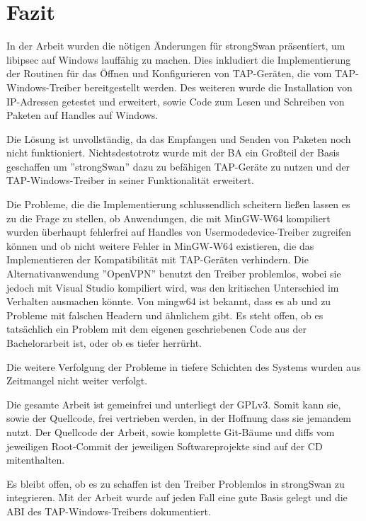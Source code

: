 



\section{Fazit}

In der Arbeit wurden die nötigen Änderungen für strongSwan präsentiert, um
libipsec auf Windows lauffähig zu machen. Dies inkludiert die Implementierung
der Routinen für das Öffnen und Konfigurieren von TAP-Geräten, die vom TAP-Windows-Treiber
bereitgestellt werden. Des weiteren wurde die Installation von IP-Adressen getestet
und erweitert, sowie Code zum Lesen und Schreiben von Paketen auf Handles auf Windows.

Die Lösung ist unvollständig, da das Empfangen und Senden von Paketen noch nicht funktioniert.
Nichtsdestotrotz wurde mit der \ac{BA} ein Großteil der Basis geschaffen um ''strongSwan''
dazu zu befähigen TAP-Geräte zu nutzen und der TAP-Windows-Treiber in seiner Funktionalität
erweitert.

Die Probleme, die die Implementierung schlussendlich scheitern ließen lassen es zu
die Frage zu stellen, ob Anwendungen, die mit MinGW-W64 kompiliert wurden überhaupt
fehlerfrei auf Handles von Usermodedevice-Treiber zugreifen können und ob
nicht weitere Fehler in MinGW-W64 existieren, die das Implementieren der Kompatibilität
mit TAP-Geräten verhindern. Die Alternativanwendung ''OpenVPN'' benutzt den
Treiber problemlos, wobei sie jedoch mit Visual Studio kompiliert wird,
was den kritischen Unterschied im Verhalten ausmachen könnte.
Von mingw64 ist bekannt, dass es ab und zu Probleme mit falschen Headern und ähnlichem
gibt. Es steht offen, ob es tatsächlich ein Problem mit dem eigenen geschriebenen Code
aus der Bachelorarbeit ist, oder ob es tiefer herrürht.

Die weitere Verfolgung der Probleme in tiefere Schichten des Systems wurden aus
Zeitmangel nicht weiter verfolgt.

Die gesamte Arbeit ist gemeinfrei und unterliegt der GPLv3. Somit kann sie,
sowie der Quellcode, frei vertrieben werden, in der Hoffnung dass sie jemandem nutzt.
Der Quellcode der Arbeit, sowie komplette Git-Bäume und diffs vom jeweiligen Root-Commit
der jeweiligen Softwareprojekte sind auf der CD mitenthalten.

Es bleibt offen, ob es zu schaffen ist den Treiber Problemlos in strongSwan zu integrieren.
Mit der Arbeit wurde auf jeden Fall eine gute Basis gelegt und die \ac{ABI} des
TAP-Windows-Treibers dokumentiert.


